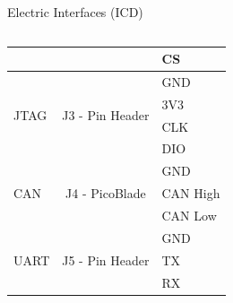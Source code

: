 \begin{frame}{Electric Interfaces (ICD)}
\begin{columns}[t]
\begin{column}[t]{0.6\textwidth}
\begin{table}[!htb]
\begin{tabular}{lcl}
                                                  &                     & CS \\
                    \midrule
                    \multirow{4}{*}{JTAG}         & \multirow{4}{*}{J3 - Pin Header} & GND \\
                                                  &                     & 3V3 \\
                                                  &                     & CLK \\
                                                  &                     & DIO \\
                    \midrule
                    \multirow{3}{*}{CAN}          & \multirow{3}{*}{J4 - PicoBlade} & GND \\
                                                  &                     & CAN High \\
                                                  &                     & CAN Low \\
                    \midrule
                    \multirow{3}{*}{UART}         & \multirow{3}{*}{J5 - Pin Header} & GND \\
                                                  &                     & TX \\
                                                  &                     & RX \\
                    \bottomrule[1.5pt]
                \end{tabular}
            \end{table}
        \end{column}
    \end{columns}

\end{frame}


